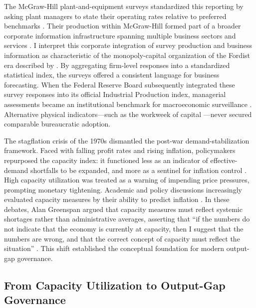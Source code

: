 The McGraw-Hill plant-and-equipment surveys standardized this reporting by asking plant managers to state their operating rates relative to preferred benchmarks \citep{Butler1958, Phillips1963}. Their production within McGraw-Hill formed part of a broader corporate information infrastructure spanning multiple business sectors and services \citep{Munroe2007}. I interpret this corporate integration of survey production and business information as characteristic of the monopoly-capital organization of the Fordist era described by \citet{BaranSweezy1988}. By aggregating firm-level responses into a standardized statistical index, the surveys offered a consistent language for business forecasting. When the Federal Reserve Board subsequently integrated these survey responses into its official Industrial Production index, managerial assessments became an institutional benchmark for macroeconomic surveillance \citep{Board2017}. Alternative physical indicators---such as the workweek of capital \citep{Foss1963, TaubmanGottschalk1971}---never secured comparable bureaucratic adoption.

The stagflation crisis of the 1970s dismantled the post-war demand-stabilization framework. Faced with falling profit rates and rising inflation, policymakers repurposed the capacity index: it functioned less as an indicator of effective-demand shortfalls to be expanded, and more as a sentinel for inflation control \citep{ShaikhManiatisPetralias1999}. High capacity utilization was treated as a warning of impending price pressures, prompting monetary tightening. Academic and policy discussions increasingly evaluated capacity measures by their ability to predict inflation \citep{KleinEtAl1973}. In these debates, Alan Greenspan argued that capacity measures must reflect systemic shortages rather than administrative averages, asserting that ``if the numbers do not indicate that the economy is currently at capacity, then I suggest that the numbers are wrong, and that the correct concept of capacity must reflect the situation'' \citep[p.~758]{KleinEtAl1973}. This shift established the conceptual foundation for modern output-gap governance.

\subsection{From Capacity Utilization to Output-Gap Governance}
\label{subsec:output_gap_governance}

